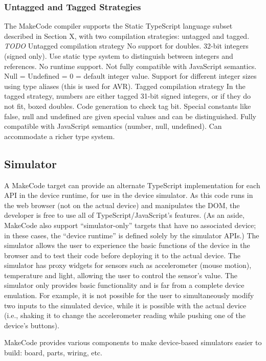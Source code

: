 \subsubsection{Untagged and Tagged Strategies}

The MakeCode compiler supports the Static TypeScript language subset described in Section X, with two compilation
strategies: untagged and tagged. 
\emph{TODO}
Untagged compilation strategy
No support for doubles. 32-bit integers (signed only). Use static type system to distinguish between integers and references.
No runtime support.  Not fully compatible with JavaScript semantics. Null = Undefined = 0 = default integer value.  Support for
different integer sizes using type aliases (this is used for AVR). 
Tagged compilation strategy
In the tagged strategy, numbers are either tagged 31-bit signed integers, or if they do not fit, boxed doubles. Code generation
to check tag bit. Special constants like false, null and undefined are given special values and can be distinguished. Fully
compatible with JavaScript semantics (number, null, undefined).   Can accommodate a richer type system. 

\subsection{Simulator}

A MakeCode target can provide an alternate TypeScript implementation for each API in the device runtime, for use in the device
simulator. As this code runs in the web browser (not on the actual device) and manipulates the DOM, the developer is free to
use all of TypeScript/JavaScript's features. (As an aside, MakeCode also support ``simulator-only'' targets that have no 
associated device; in these cases, the ``device runtime'' is defined solely by the simulator APIs.) 
The simulator allows the user to experience the basic functions of the device in the browser and to test their code
before deploying it to the actual device. The simulator has proxy widgets for sensors such as accelerometer (mouse motion),
temperature and light, allowing the user to control the sensor's value.  The simulator only provides basic functionality
and is far from a complete device emulation.   For example, it is not possible for the user to simultaneously modify two
inputs to the simulated device, while it is possible with the actual device (i.e., shaking it to change the accelerometer
reading while pushing one of the device's buttons).

MakeCode provides various components to make device-based simulators easier to build: board, parts, wiring, etc.

